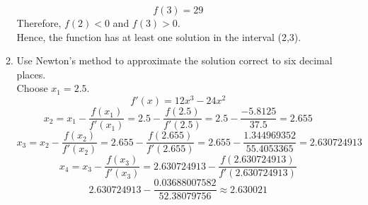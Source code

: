\documentclass[12pt]{article}
\begin{document}
\begin{enumerate}
\begin{enumerate}
        \[f(3) = 29\]
        Therefore, $f(2) < 0$ and $f(3) > 0$.\\
        Hence, the function has at least one solution in the interval (2,3).
        \item Use Newton’s method to approximate the solution correct to six decimal places.\\
        Choose $x_1 = 2.5$.
        \[f'(x) = 12x^3 - 24x^2\]
        \[x_2 = x_1 - \frac{f(x_1)}{f'(x_1)} = 2.5 - \frac{f(2.5)}{f'(2.5)} = 2.5 - \frac{-5.8125}{37.5} = 2.655\]
        \[x_3 = x_2 - \frac{f(x_2)}{f'(x_2)} = 2.655 - \frac{f(2.655)}{f'(2.655)} = 2.655 - \frac{1.344969352}{55.4053365} = 2.630724913\]
        \[x_4 = x_3 - \frac{f(x_3)}{f'(x_3)} = 2.630724913 - \frac{f(2.630724913)}{f'(2.630724913)}\]
        \[ 2.630724913 - \frac{0.03688007582}{52.38079756} \approx 2.630021\]
        
    \end{enumerate}

    

\end{enumerate}
\end{document}
